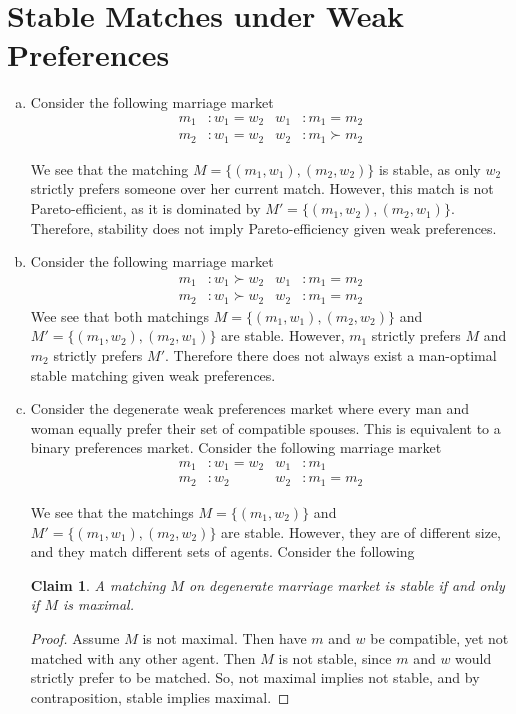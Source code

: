 \documentclass[12pt]{article}
\newtheorem*{claim}{Claim}
\begin{document}
\section{Stable Matches under Weak Preferences}
\begin{enumerate}[(a)]
\item Consider the following marriage market
\begin{align*}
m_1 &: w_1 = w_2 & w_1 &: m_1 = m_2\\
m_2 &: w_1 = w_2 & w_2 &: m_1 \succ m_2 
\end{align*}

We see that the matching $M = \{(m_1, w_1), (m_2, w_2)\}$ is stable, as only $w_2$ strictly prefers someone over her current match. However, this match is not Pareto-efficient, as it is dominated by $M' = \{(m_1, w_2), (m_2, w_1)\}$. Therefore, stability does not imply Pareto-efficiency given weak preferences.

\item Consider the following marriage market
\begin{align*}
m_1 &: w_1 \succ w_2 & w_1 &: m_1 = m_2\\
m_2 &: w_1 \succ w_2 & w_2 &: m_1 = m_2 
\end{align*}
Wee see that both matchings $M = \{(m_1, w_1), (m_2, w_2)\}$ and $M' = \{(m_1, w_2), (m_2, w_1)\}$ are stable. However, $m_1$ strictly prefers $M$ and $m_2$ strictly prefers $M'$. Therefore there does not always exist a man-optimal stable matching given weak preferences.

\item 
Consider the degenerate weak preferences market where every man and woman equally prefer their set of compatible spouses. This is equivalent to a binary preferences market. Consider the following marriage market
\begin{align*}
m_1 &: w_1 = w_2 & w_1 &: m_1\\
m_2 &: w_2 & w_2 &: m_1 = m_2 
\end{align*}

We see that the matchings $M = \{(m_1, w_2)\}$ and $M' = \{(m_1, w_1), (m_2, w_2)\}$ are stable. However, they are of different size, and they match different sets of agents. Consider the following
\begin{claim}
A matching $M$ on degenerate marriage market is stable if and only if $M$ is maximal.
\end{claim}
\begin{proof}
Assume $M$ is not maximal. Then have $m$ and $w$ be compatible, yet not matched with any other agent. Then $M$ is not stable, since $m$ and $w$ would strictly prefer to be matched. So, not maximal implies not stable, and by contraposition, stable implies maximal.


\end{proof}
\end{enumerate}
\end{document}
